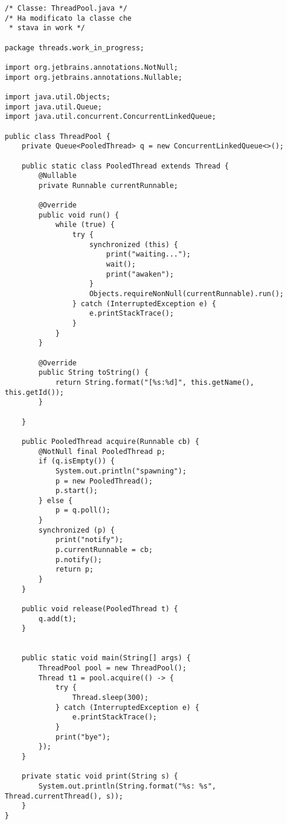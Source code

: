 \begin{lstlisting}[basicstyle=\small,]
/* Classe: ThreadPool.java */
/* Ha modificato la classe che
 * stava in work */

package threads.work_in_progress;

import org.jetbrains.annotations.NotNull;
import org.jetbrains.annotations.Nullable;

import java.util.Objects;
import java.util.Queue;
import java.util.concurrent.ConcurrentLinkedQueue;

public class ThreadPool {
    private Queue<PooledThread> q = new ConcurrentLinkedQueue<>();

    public static class PooledThread extends Thread {
        @Nullable
        private Runnable currentRunnable;

        @Override
        public void run() {
            while (true) {
                try {
                    synchronized (this) {
                        print("waiting...");
                        wait();
                        print("awaken");
                    }
                    Objects.requireNonNull(currentRunnable).run();
                } catch (InterruptedException e) {
                    e.printStackTrace();
                }
            }
        }

        @Override
        public String toString() {
            return String.format("[%s:%d]", this.getName(), this.getId());
        }

    }

    public PooledThread acquire(Runnable cb) {
        @NotNull final PooledThread p;
        if (q.isEmpty()) {
            System.out.println("spawning");
            p = new PooledThread();
            p.start();
        } else {
            p = q.poll();
        }
        synchronized (p) {
            print("notify");
            p.currentRunnable = cb;
            p.notify();
            return p;
        }
    }

    public void release(PooledThread t) {
        q.add(t);
    }


    public static void main(String[] args) {
        ThreadPool pool = new ThreadPool();
        Thread t1 = pool.acquire(() -> {
            try {
                Thread.sleep(300);
            } catch (InterruptedException e) {
                e.printStackTrace();
            }
            print("bye");
        });
    }

    private static void print(String s) {
        System.out.println(String.format("%s: %s", Thread.currentThread(), s));
    }
} 

\end{lstlisting}